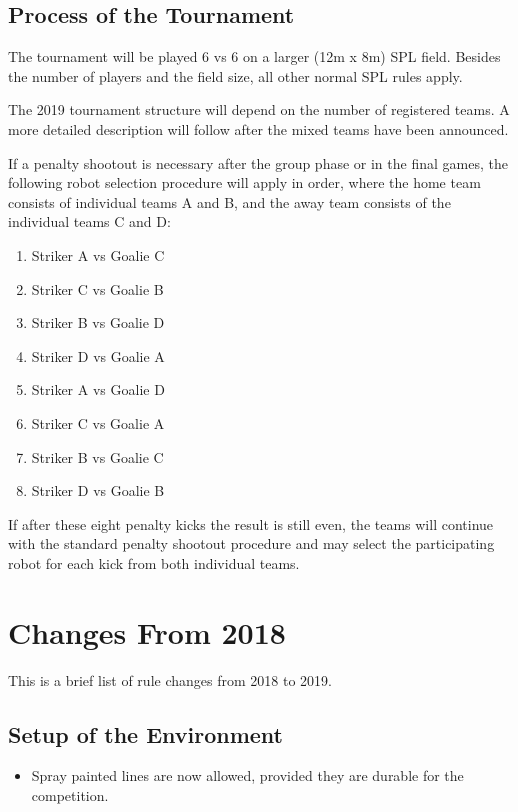 \documentclass[12pt]{article}
\begin{document}
\subsection{Process of the Tournament}
The tournament will be played 6 vs 6 on a larger (12m x 8m) SPL field. Besides the number of players and the field size, all other normal SPL rules apply. 

The 2019 tournament structure will depend on the number of registered teams. A more detailed description will follow after the mixed teams have been announced.

If a penalty shootout is necessary after the group phase or in the final games, the following robot selection procedure will apply in order, where the home team consists of individual teams A and B, and the away team consists of the individual teams C and D:

\begin{enumerate}
  \item Striker A vs Goalie C
  \item Striker C vs Goalie B
  \item Striker B vs Goalie D
  \item Striker D vs Goalie A
  \item Striker A vs Goalie D
  \item Striker C vs Goalie A
  \item Striker B vs Goalie C
  \item Striker D vs Goalie B
\end{enumerate}

If after these eight penalty kicks the result is still even, the teams will continue with the standard penalty shootout procedure and may select the participating robot for each kick from both individual teams.

\newpage

\section{Changes From 2018}
This is a brief list of rule changes from 2018 to 2019.

\subsection*{Setup of the Environment}
\begin{itemize}
  \item Spray painted lines are now allowed, provided they are durable for the competition.
\end{itemize}
\end{document}
